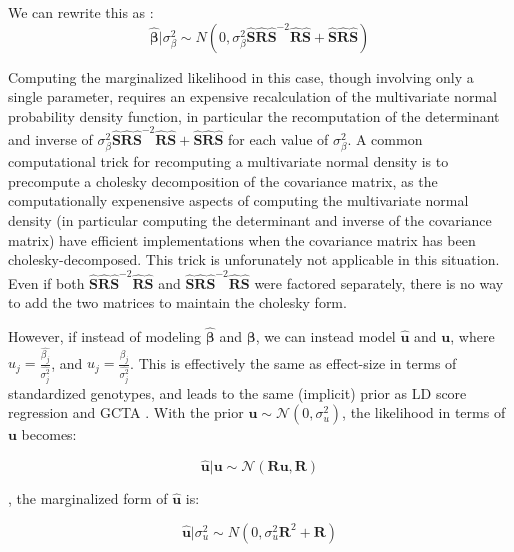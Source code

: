 {We can rewrite this as :
$$\hat{\boldsymbol{\beta}}|\sigma_\beta^2 \sim  N(0,\sigma_\beta^2\hat{\textbf{S}}\hat{\textbf{R}}\hat{\textbf{S}}^{-2}\hat{\textbf{R}}\hat{\textbf{S}}+\hat{\textbf{S}}\hat{\textbf{R}}\hat{\textbf{S}}) $$

Computing the marginalized likelihood in this case, though involving only a single parameter, requires an expensive recalculation of the multivariate normal probability density function, in particular 
the recomputation of the determinant and inverse of \(\sigma_\beta^2\hat{\textbf{S}}\hat{\textbf{R}}\hat{\textbf{S}}^{-2}\hat{\textbf{R}}\hat{\textbf{S}}+\hat{\textbf{S}}\hat{\textbf{R}}\hat{\textbf{S}}\) for each value of 
\(\sigma_\beta^2\).  A common computational trick for recomputing a multivariate normal density is to precompute a cholesky decomposition of the covariance matrix, as the computationally expenensive aspects of computing the multivariate normal density (in particular computing the determinant and inverse of the covariance matrix) have efficient implementations when the covariance matrix has been cholesky-decomposed.  This trick is unforunately not applicable in this situation.  Even if both $\hat{\textbf{S}}\hat{\textbf{R}}\hat{\textbf{S}}^{-2}\hat{\textbf{R}}\hat{\textbf{S}}$ and $\hat{\textbf{S}}\hat{\textbf{R}}\hat{\textbf{S}}^{-2}\hat{\textbf{R}}\hat{\textbf{S}}$ were factored separately, there is no way to add the two matrices to maintain the cholesky form.

However, if instead of modeling \(\hat{\boldsymbol{\beta}}\) and \(\boldsymbol{\beta}\), we can instead model $\hat{\textbf{u}}$ and $\textbf{u}$, where $\hat{u}_j=\frac{\hat{\beta_j}}{\hat{\sigma_j^2}}$, and  \(u_j=\frac{\beta_j}{\hat{\sigma_j^2}}\).  This is effectively the same as effect-size in terms of standardized genotypes, and leads to the same (implicit) prior as LD score regression \cite{ldsc} and GCTA \cite{GCTA}.  With the prior $\textbf{u} \sim \mathcal{N}(0,\sigma_u^2)$, the likelihood in terms of $\textbf{u}$ becomes:

$$\hat{\textbf{u}} | \textbf{u} \sim \mathcal{N}(\textbf{R} \textbf{u},\textbf{R})$$

, the marginalized form of $\hat{\textbf{u}}$ is:

\[ \hat{\textbf{u}}|\sigma_u^2 \sim N(0,\sigma_u^2\textbf{R}^2+\textbf{R})\]

}
